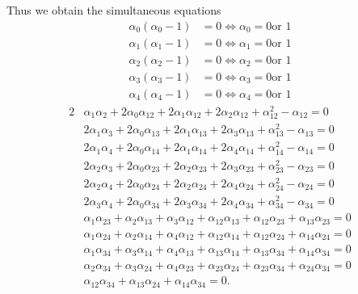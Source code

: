\documentclass[aps,preprint]{revtex4}%
\begin{document}
Thus we obtain the simultaneous equations
\begin{align}
\alpha_{0}\left(  \alpha_{0}-1\right)   &  =0\Leftrightarrow\alpha_{0}=0\text{
or }1\\
\alpha_{1}\left(  \alpha_{1}-1\right)   &  =0\Leftrightarrow\alpha_{1}=0\text{
or }1\\
\alpha_{2}\left(  \alpha_{2}-1\right)   &  =0\Leftrightarrow\alpha_{2}=0\text{
or }1\\
\alpha_{3}\left(  \alpha_{3}-1\right)   &  =0\Leftrightarrow\alpha_{3}=0\text{
or }1\\
\alpha_{4}\left(  \alpha_{4}-1\right)   &  =0\Leftrightarrow\alpha_{4}=0\text{
or }1
\end{align}%
\begin{align}
2  &  \alpha_{1}\alpha_{2}+2\alpha_{0}\alpha_{12}+2\alpha_{1}\alpha
_{12}+2\alpha_{2}\alpha_{12}+\alpha_{12}^{2}-\alpha_{12}=0\nonumber\\
&  2\alpha_{1}\alpha_{3}+2\alpha_{0}\alpha_{13}+2\alpha_{1}\alpha_{13}%
+2\alpha_{3}\alpha_{13}+\alpha_{13}^{2}-\alpha_{13}=0\nonumber\\
&  2\alpha_{1}\alpha_{4}+2\alpha_{0}\alpha_{14}+2\alpha_{1}\alpha_{14}%
+2\alpha_{4}\alpha_{14}+\alpha_{14}^{2}-\alpha_{14}=0\nonumber\\
&  2\alpha_{2}\alpha_{3}+2\alpha_{0}\alpha_{23}+2\alpha_{2}\alpha_{23}%
+2\alpha_{3}\alpha_{23}+\alpha_{23}^{2}-\alpha_{23}=0\nonumber\\
&  2\alpha_{2}\alpha_{4}+2\alpha_{0}\alpha_{24}+2\alpha_{2}\alpha_{24}%
+2\alpha_{4}\alpha_{24}+\alpha_{24}^{2}-\alpha_{24}=0\nonumber\\
&  2\alpha_{3}\alpha_{4}+2\alpha_{0}\alpha_{34}+2\alpha_{3}\alpha_{34}%
+2\alpha_{4}\alpha_{34}+\alpha_{34}^{2}-\alpha_{34}=0\nonumber\\
&  \alpha_{1}\alpha_{23}+\alpha_{2}\alpha_{13}+\alpha_{3}\alpha_{12}%
+\alpha_{12}\alpha_{13}+\alpha_{12}\alpha_{23}+\alpha_{13}\alpha
_{23}=0\nonumber\\
&  \alpha_{1}\alpha_{24}+\alpha_{2}\alpha_{14}+\alpha_{4}\alpha_{12}%
+\alpha_{12}\alpha_{14}+\alpha_{12}\alpha_{24}+\alpha_{14}\alpha
_{24}=0\nonumber\\
&  \alpha_{1}\alpha_{34}+\alpha_{3}\alpha_{14}+\alpha_{4}\alpha_{13}%
+\alpha_{13}\alpha_{14}+\alpha_{13}\alpha_{34}+\alpha_{14}\alpha
_{34}=0\nonumber\\
&  \alpha_{2}\alpha_{34}+\alpha_{3}\alpha_{24}+\alpha_{4}\alpha_{23}%
+\alpha_{23}\alpha_{24}+\alpha_{23}\alpha_{34}+\alpha_{24}\alpha
_{34}=0\nonumber\\
&  \alpha_{12}\alpha_{34}+\alpha_{13}\alpha_{24}+\alpha_{14}\alpha_{34}=0.
\end{align}
\end{document}
